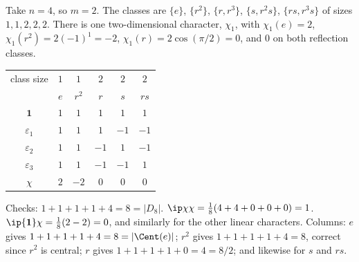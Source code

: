 \begin{example}[$D_8$]
	Take $n = 4$, so $m=2$. The classes are $\{e\}$, $\{r^2\}$, $\{r,r^3\}$, $\{s,r^2s\}$, $\{rs,r^3s\}$ of sizes $1,1,2,2,2$. There is one two-dimensional character, $\chi_1$, with $\chi_1(e)=2$, $\chi_1(r^2) = 2(-1)^1 = -2$, $\chi_1(r) = 2\cos(\pi/2) = 0$, and $0$ on both reflection classes.
	\begin{center}
	\renewcommand{\arraystretch}{1.3}
	\setlength{\tabcolsep}{11pt}
	\begin{tabular}{c|ccccc}
	\toprule
	class size & $1$ & $1$ & $2$ & $2$ & $2$\\
	 & $e$ & $r^2$ & $r$ & $s$ & $rs$\\
	\midrule
	$\mathbf 1$ & $1$ & $1$ & $1$ & $1$ & $1$\\
	$\varepsilon_1$ & $1$ & $1$ & $1$ & $-1$ & $-1$\\
	$\varepsilon_2$ & $1$ & $1$ & $-1$ & $1$ & $-1$\\
	$\varepsilon_3$ & $1$ & $1$ & $-1$ & $-1$ & $1$\\
	$\chi$ & $2$ & $-2$ & $0$ & $0$ & $0$\\
	\bottomrule
	\end{tabular}
	\end{center}
	Checks: $1+1+1+1+4 = 8 = |D_8|$. $\ip\chi\chi = \frac18(4 + 4 + 0+0+0) = 1$. $\ip{\mathbf1}\chi = \frac18(2 - 2) = 0$, and similarly for the other linear characters. Columns: $e$ gives $1+1+1+1+4 = 8 = |\Cent(e)|$; $r^2$ gives $1+1+1+1+4 = 8$, correct since $r^2$ is central; $r$ gives $1+1+1+1+0 = 4 = 8/2$; and likewise for $s$ and $rs$.
\end{example}

